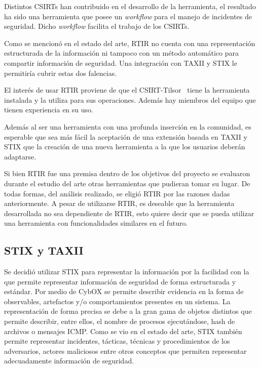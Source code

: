 \documentclass[11pt]{article}
\begin{document}
{
Distintos CSIRTs han contribuido en el desarrollo de la herramienta, el resultado ha sido una herramienta que posee un
\textit{workflow} para el manejo de incidentes de seguridad. Dicho \textit{workflow} facilita el trabajo de los
CSIRTs.}

{
Como se mencionó en el estado del arte, RTIR no cuenta con una representación estructurada de la información ni tampoco
con un método automático para compartir información de seguridad. Una integración con TAXII y STIX le permitiría cubrir
estas dos falencias.}


\bigskip

{
El interés de usar RTIR proviene de que el CSIRT-Tilsor \ tiene la herramienta instalada y la utiliza para sus
operaciones. Además hay miembros del equipo que tienen experiencia en su uso. }


\bigskip

{
Además al ser una herramienta con una profunda inserción en la comunidad, es esperable que sea más fácil la aceptación
de una extensión basada en TAXII y STIX que la creación de una nueva herramienta a la que los usuarios deberán
adaptarse.}


\bigskip

{
Si bien RTIR fue una premisa dentro de los objetivos del proyecto se evaluaron durante el estudio del arte otras
herramientas que pudieran tomar su lugar. De todas formas, del análisis realizado, se eligió RTIR por las razones dadas
anteriormente. A pesar de utilizarse RTIR, es deseable que la herramienta desarrollada no sea dependiente de RTIR, esto
quiere decir que se pueda utilizar una herramienta con funcionalidades similares en el futuro.}

\subsection{STIX y TAXII}

\bigskip

{
Se decidió utilizar STIX para representar la información por la facilidad con la que permite representar información de
seguridad de forma estructurada y estándar. Por medio de CybOX se permite describir evidencia en la forma de
observables, artefactos y/o comportamientos presentes en un sistema. La representación de forma precisa se debe a la
gran gama de objetos distintos que permite describir, entre ellos, el nombre de procesos ejecutándose, hash de archivos
o mensajes ICMP. Como se vio en el estado del arte, STIX también permite representar incidentes, tácticas, técnicas y
procedimientos de los adversarios, actores maliciosos entre otros conceptos que permiten representar adecuadamente
información de seguridad.}
\end{document}
